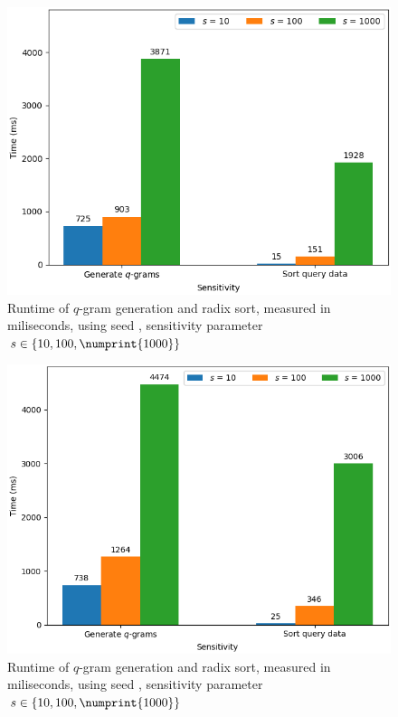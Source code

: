 \documentclass[twoside,a4paper,bsc]{master}
\newcommand{\Qgram}[1]{\(#1\)-gram}
\begin{document}
\begin{figure}
\centering
\includegraphics[scale=0.6]{graphics/hotspot_w6.png}
\caption{Runtime of \Qgram{q} generation and radix sort, measured in
miliseconds,
using seed , sensitivity parameter \(s\in\{10,100,\numprint{1000}\}\)}
\label{fig:hotspot_w6}
\end{figure}
\begin{figure}
\centering
\includegraphics[scale=0.6]{graphics/hotspot_w7.png}
\caption{Runtime of \Qgram{q} generation and radix sort, measured in
miliseconds,
using seed , sensitivity parameter \(s\in\{10,100,\numprint{1000}\}\)}
\label{fig:hotspot_w7}
\end{figure}
\end{document}

